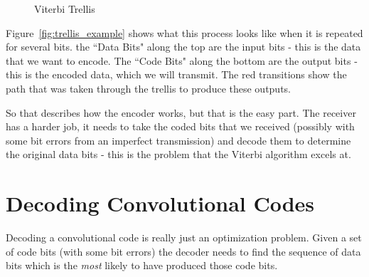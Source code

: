 \documentclass[11pt]{article}
\begin{document}
        \begin{figure*}[hb]
        \centerline{
            \qquad
        }
        \caption{Viterbi Trellis}
        \label{fig:trellis}
        \end{figure*}

        Figure~\ref{fig:trellis_example} shows what this process looks like when
        it is repeated for several bits. the ``Data Bits" along the top are the
        input bits - this is the data that we want to encode. The ``Code Bits"
        along the bottom are the output bits - this is the encoded data, which
        we will transmit.  The red transitions show the path that was taken 
        through the trellis to produce these outputs.

        So that describes how the encoder works, but that is the easy part.
        The receiver has a harder job, it needs to take the coded bits that we
        received (possibly with some bit errors from an imperfect transmission)
        and decode them to determine the original data bits - this is the
        problem that the Viterbi algorithm excels at.

    \section{Decoding Convolutional Codes}
        Decoding a convolutional code is really just an optimization problem.
        Given a set of code bits (with some bit errors) the decoder needs to
        find the sequence of data bits which is the \textit{most} likely to have
        produced those code bits.
\end{document}
